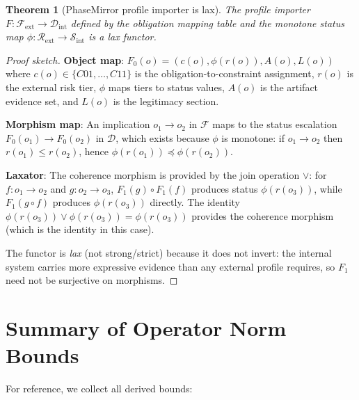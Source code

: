 \documentclass[11pt,letterpaper]{article}
\theoremstyle{pirtmthm}
\newtheorem{theorem}{Theorem}[section]
\theoremstyle{remark}
\begin{document}
\begin{theorem}[PhaseMirror profile importer is lax]
\label{thm:A-lax}
The profile importer $F : \mathcal{F}_{\text{ext}} \to \mathcal{D}_{\text{int}}$
defined by the obligation mapping table and the monotone status map
$\phi : \mathcal{R}_{\text{ext}} \to \mathcal{S}_{\text{int}}$ is a
lax functor.
\end{theorem}

\begin{proof}[Proof sketch]
\textbf{Object map}: $F_0(o) = (c(o), \phi(r(o)), A(o), L(o))$ where
$c(o) \in \{C01,\ldots,C11\}$ is the obligation-to-constraint assignment,
$r(o)$ is the external risk tier, $\phi$ maps tiers to status values,
$A(o)$ is the artifact evidence set, and $L(o)$ is the legitimacy section.

\textbf{Morphism map}: An implication $o_1 \to o_2$ in $\mathcal{F}$
maps to the status escalation $F_0(o_1) \to F_0(o_2)$ in $\mathcal{D}$,
which exists because $\phi$ is monotone:
if $o_1 \to o_2$ then $r(o_1) \leq r(o_2)$, hence
$\phi(r(o_1)) \preceq \phi(r(o_2))$.

\textbf{Laxator}: The coherence morphism is provided by the join
operation $\vee$: for $f : o_1 \to o_2$ and $g : o_2 \to o_3$,
$F_1(g) \circ F_1(f)$ produces status $\phi(r(o_3))$, while
$F_1(g \circ f)$ produces $\phi(r(o_3))$ directly. The identity
$\phi(r(o_3)) \vee \phi(r(o_3)) = \phi(r(o_3))$ provides the
coherence morphism (which is the identity in this case).

The functor is \emph{lax} (not strong/strict) because it does not
invert: the internal system carries more expressive evidence than
any external profile requires, so $F_1$ need not be surjective on
morphisms.
\end{proof}

\section{Summary of Operator Norm Bounds}
\label{sec:summary}

For reference, we collect all derived bounds:
\end{document}
